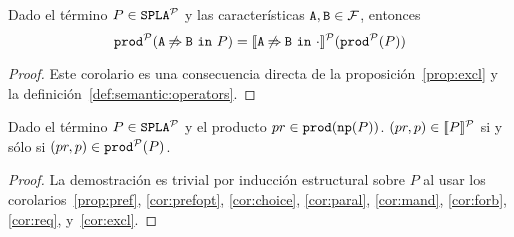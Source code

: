 \bprop\label{cor:excl}
  Dado el término $P\in\mathtt{SPLA{^{\cal P}}}$ y las características $\mathtt{A},\mathtt{B}\in{\cal F}$, entonces
  \begin{displaymath}
    \mathtt{prod}^{\cal P}(\mathtt{A}\mathbin{\not\Rightarrow}\mathtt{B}\ \mathtt{in}\ P)=[\![\mathtt{A}\mathbin{\not\Rightarrow}\mathtt{B}\ \mathtt{in}\ \cdot]\!]^{\cal P}(\mathtt{prod}^{\cal P}(P))
  \end{displaymath}
  \begin{proof}
    Este corolario es una consecuencia directa de la proposición~\ref{prop:excl} y la definición~\ref{def:semantic:operators}.
  \end{proof}
\eprop

\bthm\label{prop:equivprob}
  Dado el término $P\in\mathtt{SPLA{^{\cal P}}}$ y el producto $pr\in\mathtt{prod}(\mathtt{np}(P))$. $(pr,p)\in[\![P]\!]^{\cal P}$ si y sólo si
  $(pr,p)\in\mathtt{prod}^{\cal P}(P)$.
  \begin{proof}
    La demostración es trivial por inducción estructural sobre $P$
    al usar los corolarios~\ref{prop:pref}, \ref{cor:prefopt}, \ref{cor:choice},
    \ref{cor:paral},  \ref{cor:mand}, \ref{cor:forb}, \ref{cor:req}, y~\ref{cor:excl}.
  \end{proof}
\ethm


  
